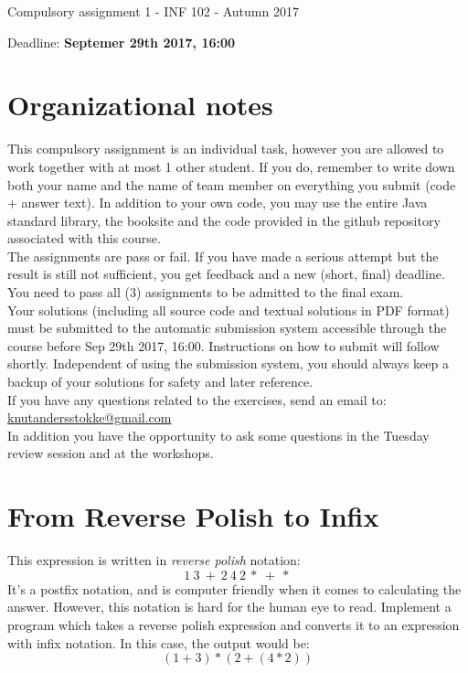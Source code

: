 \documentclass[11pt]{article}
\begin{document}
\begin{center} \huge Compulsory assignment 1 - INF 102 - Autumn 2017 \end{center}
\hfill
\begin{center} \large Deadline: \textbf{Septemer 29th 2017, 16:00} \end{center}
\hfill

\section*{Organizational notes}

\noindent
This compulsory assignment is an individual task, however you are allowed to work together with at most 1 other student. If you do, remember to write down both your name and the name of team member on everything you submit (code + answer text).
In addition to your own code, you may use the entire Java standard library, the booksite and the code provided in the github repository associated with this course.\\

\noindent
The assignments are pass or fail. If you have made a serious attempt but the result is still not  sufficient, you get feedback and a new (short, final) deadline. You need to pass all (3) assignments to be admitted to the final exam. \\

\noindent
Your solutions (including all source code and textual solutions in PDF format) must be submitted to the automatic submission system accessible through the course before Sep 29th 2017, 16:00.
Instructions on how to submit will follow shortly. Independent of using the submission system, you should always keep a backup of your solutions for safety and later reference.\\

\noindent
If you have any questions related to the exercises, send an email to: \\
\url{knutandersstokke@gmail.com} \\
In addition you have the opportunity to ask some questions in the Tuesday review session and at the workshops.


\section{From Reverse Polish to Infix}
This expression is written in \textit{reverse polish} notation:
\begin{equation}
  1\ 3\ +\ 2\ 4\ 2\ *\ +\ *
\end{equation}
It's a postfix notation, and is computer friendly when it comes to calculating the answer. However, this notation is hard for the human eye to read. Implement a program which takes a reverse polish expression and converts it to an expression with infix notation. In this case, the output would be:
\begin{equation}
  (1 + 3) * (2 + (4 * 2))
\end{equation}
\end{document}
